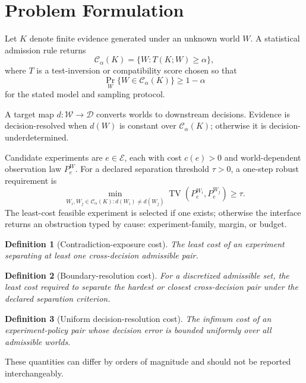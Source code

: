 \documentclass[11pt]{article}
\newtheorem{definition}{Definition}
\newcommand{\CalC}{\mathcal{C}}
\newcommand{\CalE}{\mathcal{E}}
\newcommand{\CalW}{\mathcal{W}}
\newcommand{\TV}{\operatorname{TV}}
\begin{document}
\section{Problem Formulation}
Let $K$ denote finite evidence generated under an unknown world $W$. A statistical admission rule returns
\begin{equation}
\CalC_\alpha(K)=\{W: T(K;W)\ge \alpha\},
\label{eq:admission}
\end{equation}
where $T$ is a test-inversion or compatibility score chosen so that
\begin{equation}
\Pr_W\{W\in \CalC_\alpha(K)\}\ge 1-\alpha
\label{eq:coverage}
\end{equation}
for the stated model and sampling protocol.

A target map $d:\CalW\rightarrow\mathcal{D}$ converts worlds to downstream decisions. Evidence is decision-resolved when $d(W)$ is constant over $\CalC_\alpha(K)$; otherwise it is decision-underdetermined.

Candidate experiments are $e\in\CalE$, each with cost $c(e)>0$ and world-dependent observation law $P_e^W$. For a declared separation threshold $\tau>0$, a one-step robust requirement is
\begin{equation}
\min_{W_i,W_j\in\CalC_\alpha(K):d(W_i)\neq d(W_j)}
\TV(P_e^{W_i},P_e^{W_j})\ge \tau.
\label{eq:robust}
\end{equation}
The least-cost feasible experiment is selected if one exists; otherwise the interface returns an obstruction typed by cause: experiment-family, margin, or budget.

\begin{definition}[Contradiction-exposure cost]
The least cost of an experiment separating at least one cross-decision admissible pair.
\end{definition}

\begin{definition}[Boundary-resolution cost]
For a discretized admissible set, the least cost required to separate the hardest or closest cross-decision pair under the declared separation criterion.
\end{definition}

\begin{definition}[Uniform decision-resolution cost]
The infimum cost of an experiment-policy pair whose decision error is bounded uniformly over all admissible worlds.
\end{definition}

These quantities can differ by orders of magnitude and should not be reported interchangeably.
\end{document}
